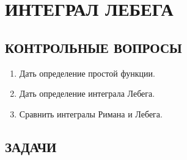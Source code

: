 \documentclass[12pt,a4paper]{article}
\begin{document}
\section{ИНТЕГРАЛ ЛЕБЕГА}

\subsection*{КОНТРОЛЬНЫЕ ВОПРОСЫ}
\begin{enumerate}
\item Дать определение простой функции.
\item Дать определение интеграла Лебега.
\item Сравнить интегралы Римана и Лебега.
\end{enumerate}

\subsection*{ЗАДАЧИ}
\end{document}
